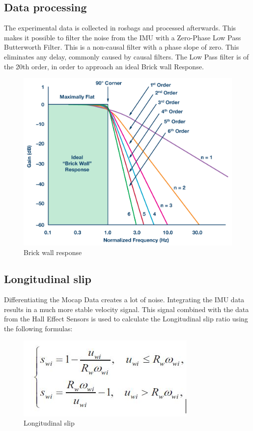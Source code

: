\subsection{Data processing} 	
The experimental data is collected in rosbags and processed afterwards. This makes it possible to filter the noise from the IMU with a Zero-Phase Low Pass Butterworth Filter. This is a non-causal filter with a phase slope of zero. This eliminates any delay, commonly caused by causal filters. The Low Pass filter is of the 20th order, in order to approach an ideal \textquotesingle Brick wall Response\textquotesingle .
	\begin{figure}
	\centering
	\includegraphics[scale=0.17]{figure/brickwall.png}
	\caption{Brick wall response}
	\label{fig:brickwall}
	\end{figure}



\subsection{Longitudinal slip}
Differentiating the Mocap Data creates a lot of noise. Integrating the IMU data results in a much more stable velocity signal. This signal combined with the data from the Hall Effect Sensors is used to calculate the Longitudinal slip ratio using the following formulas:
\begin{figure}
	\centering
	\includegraphics[scale=0.4]{figure/Longitudonalslip}
	\caption{Longitudinal slip}
	\label{fig:brickwall}
	\end{figure}


